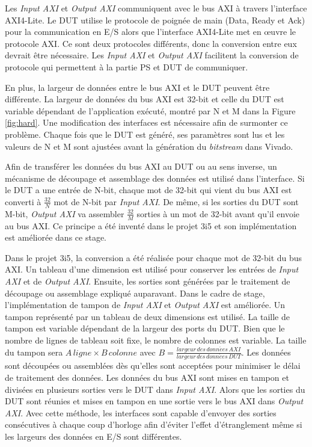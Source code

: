 Les \emph{Input AXI} et \emph{Output AXI} communiquent avec le bus AXI à travers l'interface AXI4-Lite.
Le DUT utilise le protocole de poignée de main (Data, Ready et Ack) pour
la communication en E/S alors que l'interface AXI4-Lite met en œuvre le protocole AXI.
Ce sont deux protocoles différents, donc la conversion entre eux devrait être nécessaire. 
Les \emph{Input AXI} et \emph{Output AXI}
facilitent la conversion de protocole qui permettent à la partie PS et DUT de communiquer.

En plus, la largeur de données entre le bus AXI et le DUT peuvent être différente.
La largeur de données du bus AXI est 32-bit et celle du DUT est variable dépendant de l'application
exécuté, montré par N et M dans la Figure \ref{fig:hard}. Une modification des interfaces est nécessaire afin
de surmonter ce problème. Chaque fois que le DUT est généré, ses paramètres sont
lus et les valeurs de N et M sont ajustées avant la génération du \emph{bitstream} dans Vivado. 

Afin de transférer les données du bus AXI au DUT ou au sens inverse, un mécanisme de découpage et assemblage
des données est utilisé dans l'interface. Si le DUT a une entrée de N-bit, 
chaque mot de 32-bit qui vient du bus AXI est converti à $\frac{32}{N}$ mot de N-bit par \emph{Input AXI}. De même,
si les sorties du DUT sont M-bit, \emph{Output AXI} va assembler $\frac{32}{M}$ sorties à un mot de 32-bit avant qu'il envoie
au bus AXI. Ce principe a été inventé dans le projet 3i5 et son implémentation est améliorée dans ce stage.

Dans le projet 3i5, la conversion a été réalisée pour chaque mot de 32-bit du bus AXI. Un tableau d'une dimension
est utilisé pour conserver les entrées de \emph{Input AXI} et de \emph{Output AXI}. 
Ensuite, les sorties sont générées par le traitement de découpage ou assemblage expliqué auparavant.
Dans le cadre de stage, l'implémentation de tampon de \emph{Input AXI} et \emph{Output AXI} est améliorée. 
Un tampon représenté par un tableau de deux dimensions est utilisé. 
La taille de tampon est variable dépendant de la largeur des ports du DUT.
Bien que le nombre de lignes de tableau soit fixe, le nombre de colonnes est variable. La taille du tampon
sera $ A\,ligne \times B\, colonne$ avec $B = \frac{largeur \, des \, donn\acute{e}es \, AXI }{largeur \, des \, donn\acute{e}es \, DUT} $.
Les données sont découpées ou assemblées dès qu'elles sont acceptées pour minimiser le délai de
traitement des données.
Les données du bus AXI sont mises en tampon et divisées en plusieurs sorties vers le DUT dans \emph{Input AXI}.
Alors que les sorties du DUT sont réunies et mises en tampon en une sortie vers le bus AXI dans \emph{Output AXI}.
Avec cette méthode, les interfaces sont capable d'envoyer des sorties consécutives à chaque coup d'horloge
afin d'éviter l'effet d'étranglement même si les largeurs des données en E/S sont différentes.

